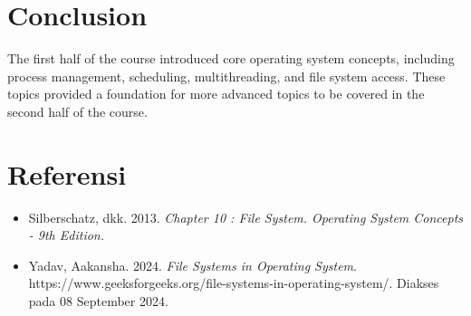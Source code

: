 \documentclass[12pt]{article}
\begin{document}
\section{Conclusion}
The first half of the course introduced core operating system concepts, including process management, scheduling, multithreading, and file system access. These topics provided a foundation for more advanced topics to be covered in the second half of the course.

\section{Referensi}
\sloppy
\begin{itemize}
    \item {Silberschatz, dkk. 2013. \textit{Chapter 10 : File System. Operating System Concepts - 9th Edition.}}
    \item {Yadav, Aakansha. 2024. \textit{File Systems in Operating System}. https://www.geeksforgeeks.org/file-systems-in-operating-system/. Diakses pada 08 September 2024.}
\end{itemize}
\fussy
\end{document}

